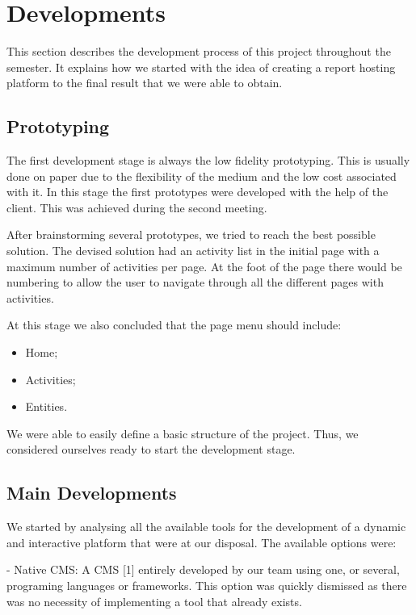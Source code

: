 \documentclass[a4paper,12pt,journal,twoside,compsoc]{PPIEEEtran}
\begin{document}
\section{Developments}

This section describes the development process of this project throughout the semester. It explains how we started with the idea of creating a report hosting platform to the final result that we were able to obtain.

\subsection{Prototyping}

The first development stage is always the low fidelity prototyping. This is usually done on paper due to the flexibility of the medium and the low cost associated with it. In this stage the first prototypes were developed with the help of the client. This was achieved during the second meeting.

After brainstorming several prototypes, we tried to reach the best possible solution. The devised solution had an activity list in the initial page with a maximum number of activities per page. At the foot of the page there would be numbering to allow the user to navigate through all the different pages with activities.

At this stage we also concluded that the page menu should include:
\begin{itemize}
	\item Home;
	\item Activities;
	\item Entities.
\end{itemize}

We were able to easily define a basic structure of the project. Thus, we considered ourselves ready to start the development stage.

\subsection{Main Developments}

We started by analysing all the available tools for the development of a dynamic and interactive platform that were at our disposal. The available options were:

- Native \ac{CMS}: A \ac{CMS} [1] entirely developed by our team using one, or several, programing languages or frameworks. This option was quickly dismissed as there was no necessity of implementing a tool that already exists.
\end{document}
